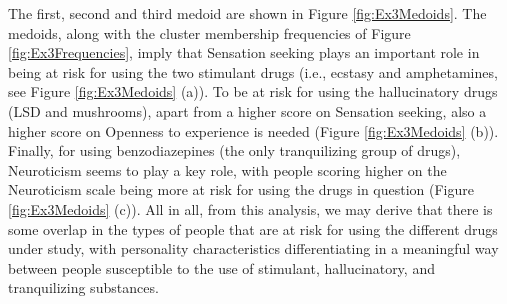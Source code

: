 The first, second and third medoid are shown in Figure \ref{fig:Ex3Medoids}. The medoids, along with the cluster membership frequencies of Figure \ref{fig:Ex3Frequencies}, imply that Sensation seeking plays an important role in being at risk for using the two stimulant drugs (i.e., ecstasy and amphetamines, see Figure \ref{fig:Ex3Medoids} (a)). To be at risk for using the hallucinatory drugs (LSD and mushrooms), apart from a higher score on Sensation seeking, also a higher score on Openness to experience is needed (Figure \ref{fig:Ex3Medoids} (b)). Finally, for using benzodiazepines (the only tranquilizing group of drugs), Neuroticism seems to play a key role, with people scoring higher on the Neuroticism scale being more at risk for using the drugs in question (Figure \ref{fig:Ex3Medoids} (c)). All in all, from this analysis, we may derive that there is some overlap in the types of people that are at risk for using the different drugs under study, with personality characteristics differentiating in a meaningful way between people susceptible to the use of stimulant, hallucinatory, and tranquilizing substances.
